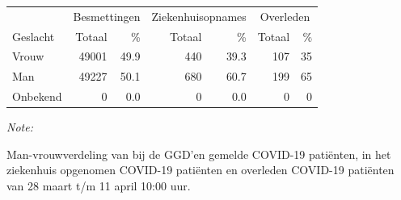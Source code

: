 \documentclass[
  english,
  man,floatsintext]{apa6}
\begin{document}
\begin{table}
\centering\begingroup\fontsize{11}{13}\selectfont

\begin{threeparttable}
\begin{tabular}{lrrrrrr}
\toprule
\multicolumn{1}{c}{ } & \multicolumn{2}{c}{Besmettingen} & \multicolumn{2}{c}{Ziekenhuisopnames} & \multicolumn{2}{c}{Overleden} \\
\cmidrule(l{3pt}r{3pt}){2-3} \cmidrule(l{3pt}r{3pt}){4-5} \cmidrule(l{3pt}r{3pt}){6-7}
Geslacht & Totaal & \% & Totaal & \% & Totaal & \%\\
\midrule
Vrouw & 49001 & 49.9 & 440 & 39.3 & 107 & 35\\
Man & 49227 & 50.1 & 680 & 60.7 & 199 & 65\\
Onbekend & 0 & 0.0 & 0 & 0.0 & 0 & 0\\
\bottomrule
\end{tabular}
\begin{tablenotes}
\item \textit{Note: } 
\item Man-vrouwverdeling van bij de GGD’en gemelde COVID-19 patiënten, in het ziekenhuis opgenomen COVID-19 patiënten en overleden COVID-19 patiënten van 28 maart t/m 11 april 10:00 uur.
\end{tablenotes}
\end{threeparttable}
\endgroup{}
\end{table}
\newpage
\end{document}
